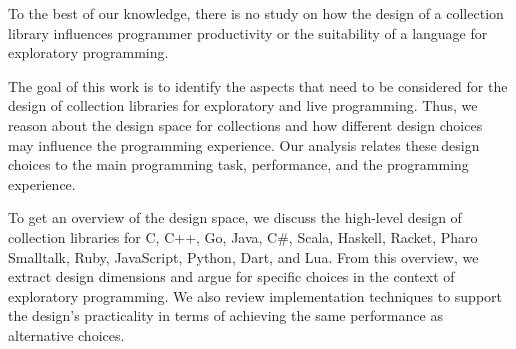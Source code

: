 \documentclass[sigconf, 10pt]{acmart}
\begin{document}
To the best of our knowledge,
there is no study on how the design of a collection library
influences programmer productivity
or the suitability of a language for exploratory programming.

The goal of this work is to identify the aspects
that need to be considered for the design of collection libraries
for exploratory and live programming.
%
%
Thus, we reason about the design space for collections
and how different design choices may influence the programming experience.
Our analysis relates these design choices to the main programming task,
performance, and the programming experience.

To get an overview of the design space,
we discuss the high-level design of collection libraries for
C, C++, Go, Java, C\#, Scala, Haskell, Racket, Pharo Smalltalk, Ruby, JavaScript, Python, Dart, and Lua.
From this overview, we extract design dimensions and 
argue for specific choices in the context of exploratory programming.
We also review implementation techniques
to support the design's practicality
in terms of achieving the same performance as alternative choices.
\end{document}
